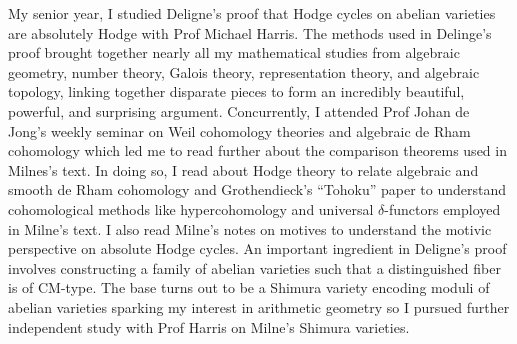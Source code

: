 \documentclass[11pt]{article}
\begin{document}
My senior year, I studied Deligne's proof that Hodge cycles on abelian varieties are absolutely Hodge with Prof Michael Harris. The methods used in Delinge's proof brought together nearly all my mathematical studies from algebraic geometry, number theory, Galois theory, representation theory, and algebraic topology, linking together disparate pieces to form an incredibly beautiful, powerful, and surprising argument. 
Concurrently, I attended Prof Johan de Jong's weekly seminar on Weil cohomology theories and algebraic de Rham cohomology which led me to read further about the comparison theorems used in Milnes's text. In doing so, I read about Hodge theory to relate algebraic and smooth de Rham cohomology and Grothendieck's ``Tohoku'' paper to understand cohomological methods like hypercohomology and universal $\delta$-functors employed in Milne's text. I also read Milne's notes on motives to understand the motivic perspective on absolute Hodge cycles. An important ingredient in Deligne's proof involves constructing a family of abelian varieties such that a distinguished fiber is of CM-type. The base turns out to be a Shimura variety encoding moduli of abelian varieties sparking my interest in arithmetic geometry so I pursued further independent study with Prof Harris on Milne's Shimura varieties.
\par
\end{document}
